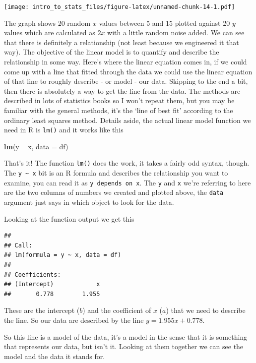 \documentclass[
]{book}
\newenvironment{Shaded}{\begin{snugshade}}{\end{snugshade}}
\newcommand{\DataTypeTok}[1]{\textcolor[rgb]{0.13,0.29,0.53}{#1}}
\newcommand{\KeywordTok}[1]{\textcolor[rgb]{0.13,0.29,0.53}{\textbf{#1}}}
\newcommand{\NormalTok}[1]{#1}
\newcommand{\OperatorTok}[1]{\textcolor[rgb]{0.81,0.36,0.00}{\textbf{#1}}}
\newcommand{\StringTok}[1]{\textcolor[rgb]{0.31,0.60,0.02}{#1}}
\begin{document}
\texttt{[image: intro\_to\_stats\_files/figure-latex/unnamed-chunk-14-1.pdf]}

The graph shows 20 random \(x\) values between 5 and 15 plotted against 20 \(y\) values which are calculated as \(2x\) with a little random noise added. We can see that there is definitely a relationship (not least because we engineered it that way). The objective of the linear model is to quantify and describe the relationship in some way. Here's where the linear equation comes in, if we could come up with a line that fitted through the data we could use the linear equation of that line to roughly describe - or model - our data. Skipping to the end a bit, then there is absolutely a way to get the line from the data. The methods are described in lots of statistics books so I won't repeat them, but you may be familiar with the general methods, it's the `line of best fit' according to the ordinary least squares method. Details aside, the actual linear model function we need in R is \texttt{lm()} and it works like this

\begin{Shaded}
\begin{Highlighting}[]
\KeywordTok{lm}\NormalTok{(y }\OperatorTok{~}\StringTok{ }\NormalTok{x, }\DataTypeTok{data =}\NormalTok{ df)}
\end{Highlighting}
\end{Shaded}

That's it! The function \texttt{lm()} does the work, it takes a fairly odd syntax, though. The \texttt{y\ \textasciitilde{}\ x} bit is an R formula and describes the relationship you want to examine, you can read it as \texttt{y\ depends\ on\ x}. The \texttt{y} and \texttt{x} we're referring to here are the two columns of numbers we created and plotted above, the \texttt{data} argument just says in which object to look for the data.

Looking at the function output we get this

\begin{verbatim}
## 
## Call:
## lm(formula = y ~ x, data = df)
## 
## Coefficients:
## (Intercept)            x  
##       0.778        1.955
\end{verbatim}

These are the intercept (\(b\)) and the coefficient of \(x\) (\(a\)) that we need to describe the line. So our data are described by the line \(y = 1.955x + 0.778\).

So this line is a model of the data, it's a model in the sense that it is something that represents our data, but isn't it. Looking at them together we can see the model and the data it stands for.
\end{document}
